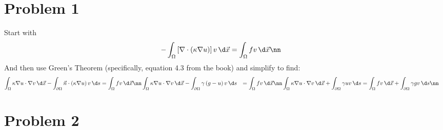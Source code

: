 
\usepackage{listings} %


\section{Problem 1}
Start with
\begin{align}
  -\int_\Omega \left[\nabla\cdot\left(\kappa\nabla u\right)\right]v\,\d\vec x &= \int_\Omega fv\,\d\vec x\nn
\end{align}
And then use Green's Theorem (specifically, equation 4.3 from the book) and simplify to find:
\begin{align}
  \int_\Omega \kappa \nabla u \cdot \nabla v\,\d\vec x - \int_{\partial\Omega}\vec n\cdot\left(\kappa\nabla u\right)v\,\d s &= \int_\Omega fv \,\d\vec x\nn
  \int_\Omega \kappa \nabla u \cdot \nabla v \,\d\vec x - \int_{\partial\Omega}\gamma\left(g-u\right)v\,\d s &= \int_\Omega fv \,\d\vec x\nn
  \int_\Omega \kappa \nabla u \cdot \nabla v\,\d\vec x + \int_{\partial\Omega}\gamma uv\,\d s &= \int_\Omega fv\,\d\vec x + \int_{\partial\Omega}\gamma gv\,\d s \nn
\end{align}

\section{Problem 2}


